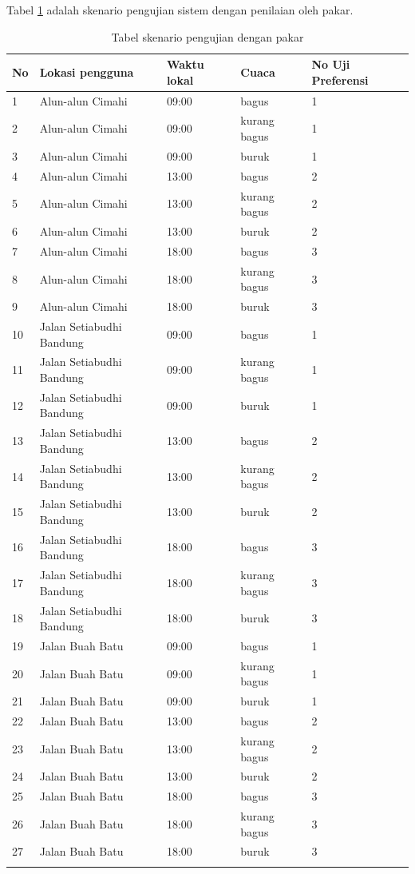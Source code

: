 \par
Tabel \ref{table:scenario} adalah skenario pengujian sistem dengan penilaian oleh pakar.
\begin{center}
\small
\begin{longtable}{ |l|l|l|l|m{2cm}| } 
\hline
\textbf{No} & \textbf{Lokasi pengguna} & \textbf{Waktu lokal} & \textbf{Cuaca} & \textbf{No Uji Preferensi} \\
\hline
1	&	Alun-alun Cimahi	&	09:00	& bagus & 1\\
\hline
2	&	Alun-alun Cimahi	&	09:00	& kurang bagus & 1\\
\hline
3	&	Alun-alun Cimahi	&	09:00	& buruk & 1\\
\hline
4	&	Alun-alun Cimahi	&	13:00	& bagus & 2\\
\hline
5	&	Alun-alun Cimahi	&	13:00	& kurang bagus & 2\\
\hline
6	&	Alun-alun Cimahi	&	13:00	& buruk & 2\\
\hline
7	&	Alun-alun Cimahi	&	18:00	& bagus & 3\\
\hline
8	&	Alun-alun Cimahi	&	18:00	& kurang bagus & 3\\
\hline
9	&	Alun-alun Cimahi	&	18:00	& buruk & 3\\
\hline
10	&	Jalan Setiabudhi Bandung	&	09:00	& bagus & 1\\
\hline
11	&	Jalan Setiabudhi Bandung	&	09:00	& kurang bagus & 1\\
\hline
12	&	Jalan Setiabudhi Bandung	&	09:00	& buruk & 1\\
\hline
13	&	Jalan Setiabudhi Bandung	&	13:00	& bagus & 2\\
\hline
14	&	Jalan Setiabudhi Bandung	&	13:00	& kurang bagus & 2\\
\hline
15	&	Jalan Setiabudhi Bandung	&	13:00	& buruk & 2\\
\hline
16	&	Jalan Setiabudhi Bandung	&	18:00	& bagus & 3\\
\hline
17	&	Jalan Setiabudhi Bandung	&	18:00	& kurang bagus & 3\\
\hline
18	&	Jalan Setiabudhi Bandung	&	18:00	& buruk & 3\\
\hline
19	&	Jalan Buah Batu	&	09:00	& bagus & 1\\
\hline
20	&	Jalan Buah Batu	&	09:00	& kurang bagus & 1\\
\hline
21	&	Jalan Buah Batu	&	09:00	& buruk & 1\\
\hline
22	&	Jalan Buah Batu	&	13:00	& bagus & 2\\
\hline
23	&	Jalan Buah Batu	&	13:00	& kurang bagus & 2\\
\hline
24	&	Jalan Buah Batu	&	13:00	& buruk & 2\\
\hline
25	&	Jalan Buah Batu	&	18:00	& bagus & 3\\
\hline
26	&	Jalan Buah Batu	&	18:00	& kurang bagus & 3\\
\hline
27	&	Jalan Buah Batu	&	18:00	& buruk & 3\\
\hline
\caption{Tabel skenario pengujian dengan pakar}
\label{table:scenario}
\end{longtable}
\end{center}

